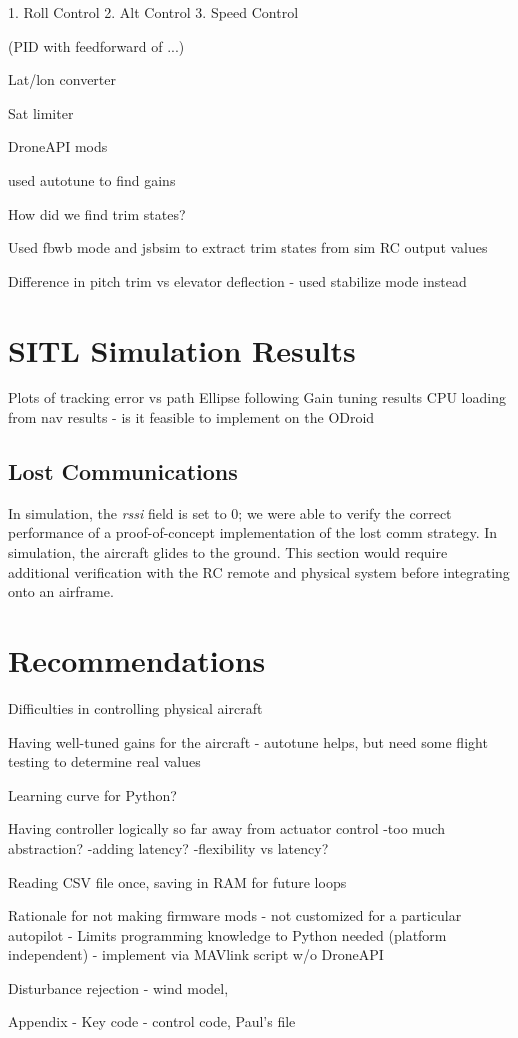 \documentclass{aiaa}
\begin{document}
1. Roll Control
2. Alt Control
3. Speed Control

(PID with feedforward of ...)

Lat/lon converter

Sat limiter

DroneAPI mods 

used autotune to find gains

How did we find trim states?

Used fbwb mode and jsbsim to extract trim states from sim RC output values

Difference in pitch trim vs elevator deflection - used stabilize mode instead


\section{SITL Simulation Results}

Plots of tracking error vs path 
Ellipse following
Gain tuning results
CPU loading from nav results - is it feasible to implement on the ODroid


\subsection{Lost Communications}
In simulation, the \textit{rssi} field is set to 0; we were able to verify the correct performance of a proof-of-concept implementation of the lost comm strategy. In simulation, the aircraft glides to the ground. This section would require additional verification with the RC remote and physical system before integrating onto an airframe.
\section{Recommendations}

Difficulties in controlling physical aircraft

Having well-tuned gains for the aircraft - autotune helps, but need some flight testing to determine real values

Learning curve for Python?

Having controller logically so far away from actuator control
-too much abstraction?
-adding latency?
-flexibility vs latency?

Reading CSV file once, saving in RAM for future loops

Rationale for not making firmware mods
 - not customized for a particular autopilot
 - Limits programming knowledge to Python needed (platform independent)
 - implement via MAVlink script w/o DroneAPI 
 
Disturbance rejection - wind model,  
 
Appendix - 
Key code - control code, Paul's file
\end{document}
